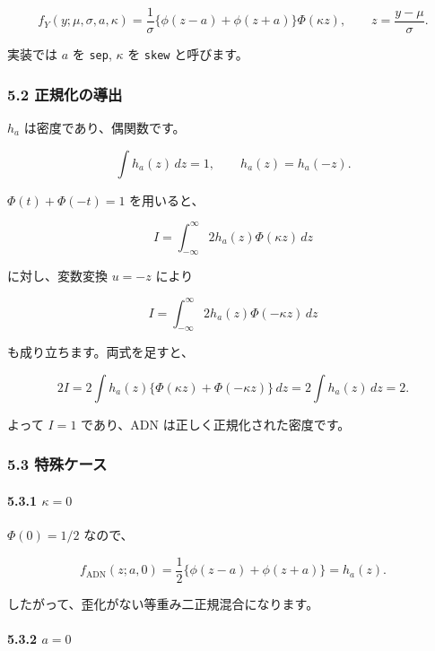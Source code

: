 \documentclass[
]{article}
\begin{document}
\[
f_Y(y;\mu,\sigma,a,\kappa)
=\frac{1}{\sigma}\{\phi(z-a)+\phi(z+a)\}\Phi(\kappa z),
\qquad
z=\frac{y-\mu}{\sigma}.
\]

実装では \(a\) を \texttt{sep}, \(\kappa\) を \texttt{skew} と呼びます。

\hypertarget{ux6b63ux898fux5316ux306eux5c0eux51fa}{%
\subsubsection{5.2
正規化の導出}\label{ux6b63ux898fux5316ux306eux5c0eux51fa}}

\(h_a\) は密度であり、偶関数です。

\[
\int h_a(z)\,dz=1,
\qquad
h_a(z)=h_a(-z).
\]

\(\Phi(t)+\Phi(-t)=1\) を用いると、

\[
I=\int_{-\infty}^{\infty}2h_a(z)\Phi(\kappa z)\,dz
\]

に対し、変数変換 \(u=-z\) により

\[
I=\int_{-\infty}^{\infty}2h_a(z)\Phi(-\kappa z)\,dz
\]

も成り立ちます。両式を足すと、

\[
2I=2\int h_a(z)\{\Phi(\kappa z)+\Phi(-\kappa z)\}\,dz
=2\int h_a(z)\,dz=2.
\]

よって \(I=1\) であり、ADN は正しく正規化された密度です。

\hypertarget{ux7279ux6b8aux30b1ux30fcux30b9}{%
\subsubsection{5.3 特殊ケース}\label{ux7279ux6b8aux30b1ux30fcux30b9}}

\hypertarget{kappa0}{%
\paragraph{\texorpdfstring{5.3.1
\(\kappa=0\)}{5.3.1 \textbackslash kappa=0}}\label{kappa0}}

\(\Phi(0)=1/2\) なので、

\[
f_{\mathrm{ADN}}(z;a,0)
=\frac{1}{2}\{\phi(z-a)+\phi(z+a)\}=h_a(z).
\]

したがって、歪化がない等重み二正規混合になります。

\hypertarget{a0}{%
\paragraph{\texorpdfstring{5.3.2 \(a=0\)}{5.3.2 a=0}}\label{a0}}
\end{document}
